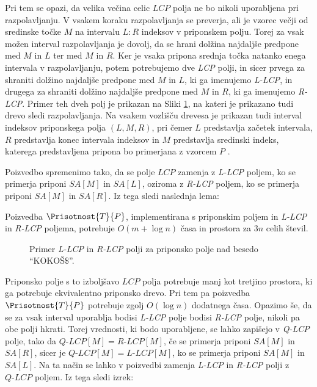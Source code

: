 
Pri tem se opazi, da velika večina celic $LCP$ polja ne bo nikoli uporabljena pri razpolavljanju. V vsakem koraku razpolavljanja se preverja, ali je vzorec večji od sredinske točke $M$ na intervalu $L:R$ indeksov v priponskem polju. Torej za vsak možen interval razpolavljanja je dovolj, da se hrani dolžina najdaljše predpone med $M$ in $L$ ter med $M$ in $R$. Ker je vsaka pripona srednja točka natanko enega intervala v razpolavljanju, potem potrebujemo dve \textit{LCP} polji, in sicer prvega za shraniti dolžino najdaljše predpone med $M$ in $L$, ki ga imenujemo \textit{L-LCP}, in drugega za shraniti dolžino najdaljše predpone med $M$ in $R$, ki ga imenujemo \textit{R-LCP}. Primer teh dveh polj je prikazan na Sliki \ref{fig:RlcpLlcpSuffuxArray}, na kateri je prikazano tudi drevo sledi razpolavljanja. Na vsakem vozlišču drevesa je prikazan tudi interval indeksov priponskega polja $(L,M,R)$, pri čemer $L$ predstavlja začetek intervala, $R$ predstavlja konec intervala indeksov in $M$ predstavlja sredinski indeks, katerega predstavljena pripona bo primerjana z vzorcem $P$ \cite{Manber1990}. 

Poizvedbo spremenimo tako, da se polje $LCP$ zamenja z \textit{L-LCP} poljem, ko se primerja priponi $SA[M]$ in $SA[L]$, oziroma z \textit{R-LCP} poljem, ko se primerja priponi $SA[M]$ in $SA[R]$. Iz tega sledi naslednja lema:

\begin{lema}\label{lema:LRLCP}
    Poizvedba $\Prisotnost{T}{P}$, implementirana s priponskim poljem in \textit{L-LCP} in \textit{R-LCP} poljema, potrebuje $O(m+\log{n})$ časa in prostora za $3n$ celih števil.
\end{lema}

\begin{figure}[tb] 
    
    \centering
    \caption{Primer \textit{L-LCP} in \textit{R-LCP} polji za priponsko polje nad besedo \enquote{KOKOŠ$\$$}.} 
    \label{fig:RlcpLlcpSuffuxArray}
\end{figure}

Priponsko polje s to izboljšavo $LCP$ polja potrebuje manj kot tretjino prostora, ki ga potrebuje ekvivalentno priponsko drevo. Pri tem pa poizvedba $\Prisotnost{T}{P}$ potrebuje zgolj $O(\log{n})$ dodatnega časa. Opazimo še, da se za vsak interval uporablja bodisi \textit{L-LCP} polje bodisi \textit{R-LCP} polje, nikoli pa obe polji hkrati. Torej vrednosti, ki bodo uporabljene, se lahko zapišejo v \textit{Q-LCP} polje, tako da $\textit{Q-LCP}[M]= \textit{R-LCP}[M]$, če se primerja priponi $SA[M]$ in $SA[R]$, sicer je $\textit{Q-LCP}[M]= \textit{L-LCP}[M]$, ko se primerja priponi $SA[M]$ in $SA[L]$. Na ta način se lahko v poizvedbi zamenja \textit{L-LCP} in \textit{R-LCP} polji z $\textit{Q-LCP}$ poljem. Iz tega sledi izrek:

